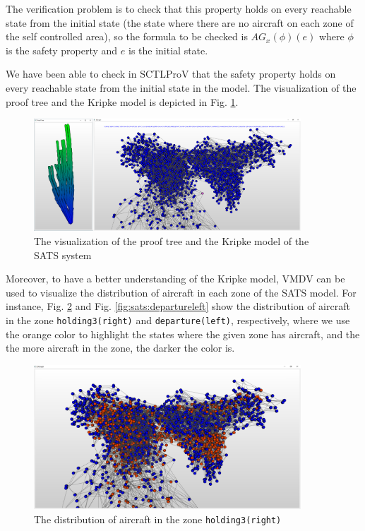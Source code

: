 \documentclass[runningheads]{llncs}
\newcommand\tool[1]{\textsf{#1}}
\begin{document}
\begin{example} 
	The verification problem is to check that this
	property holds on every reachable state from the initial state (the
	state where there are no aircraft on each zone of the self controlled
	area), so the formula to be checked is $AG_x(\phi)(e)$ where $\phi$ is 
	the safety property and $e$ is the initial state.
	
	We have been able to check in
	\textsf{SCTLProV} that the safety property holds on every reachable state from the initial state in the model.
	The visualization of the proof tree and the Kripke model is depicted in Fig. \ref{fig:sats}.
	
	\begin{figure}[h!]
		\centering
		\includegraphics[width=10cm]{./sats_prooftree_model.png}
		\caption{The visualization of the proof tree and the Kripke model of the SATS system}
		\label{fig:sats}
	\end{figure}

	Moreover, to have a better understanding of the Kripke model, \tool{VMDV} can be used to visualize the distribution of aircraft in each zone of the SATS model. For instance, Fig. \ref{fig:sats:holding3right} and Fig. \ref{fig:sats:departureleft} show the distribution of aircraft in the zone {\tt holding3(right)} and {\tt departure(left)}, respectively, where we use the orange color to highlight the states where the given zone has aircraft, and the the more aircraft in the zone, the darker the color is.
	
	\begin{figure}[h!]
		\centering
		\includegraphics[width=10cm]{sats_holding3right.png}
		\caption{The distribution of aircraft in the zone {\tt holding3(right)}}
		\label{fig:sats:holding3right}
	\end{figure}


\end{example}
\end{document}

